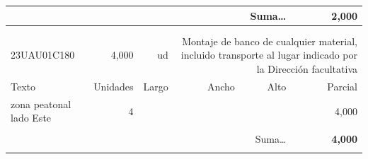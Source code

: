 \documentclass{book}%
\begin{document}
\begin{longtable}{lrrrrr}
\multicolumn{5}{r}{Suma\ldots}&\textbf{     2,000}\\%
\hline%
&&&&&\\%
&&&&&\\%
23UAU01C180&     4,000& ud&\multicolumn{3}{p{6cm}}{\scriptsize Montaje de banco de cualquier material, incluido transporte al lugar indicado por la Dirección facultativa\normalsize}\\%
Texto&Unidades&Largo&Ancho&Alto&Parcial\\%
\hline%
\multicolumn{1}{p{3.5cm}}{ zona peatonal lado Este}&4&&&&     4,000\\%
&&&&&\\%
\multicolumn{5}{r}{Suma\ldots}&\textbf{     4,000}\\%
\hline%
&&&&&\\%
\end{longtable}%
\newpage

%
\end{document}
